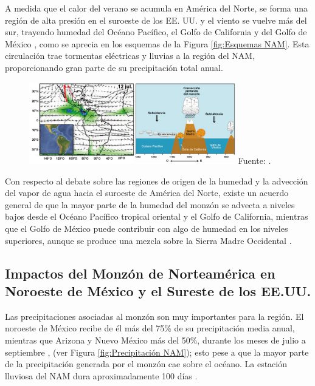 \documentclass[12pt]{article}
\begin{document}
A medida que el calor del verano se acumula en América del Norte, se forma una región de alta presión en el suroeste de los EE. UU. y el viento se vuelve más del sur, trayendo humedad del Océano Pacífico, el Golfo de California y del Golfo de México \cite{COMET2}, como se aprecia en los esquemas de la Figura \ref{fig:Esquemas NAM}. Esta circulación trae tormentas eléctricas y lluvias a la región del NAM, proporcionando gran parte de su precipitación total anual.

\begin{figure}[H]
	\begin{center}
 		\includegraphics[width = 0.8\textwidth]{Imagenes/Esquemas NAM.png}
 		Fuente: \cite{COMET}.
	\end{center} 
\end{figure}

Con respecto al debate sobre las regiones de origen de la humedad y la advección del vapor de agua hacia el suroeste de América del Norte, existe un acuerdo general de que la mayor parte de la humedad del monzón se advecta a niveles bajos desde el Océano Pacífico tropical oriental y el Golfo de California, mientras que el Golfo de México puede contribuir con algo de humedad en los niveles superiores, aunque se produce una mezcla sobre la Sierra Madre Occidental \cite{Climategov}.

\subsection{Impactos del Monzón de Norteamérica en Noroeste de México y el Sureste de los EE.UU.}

Las precipitaciones asociadas al monzón son muy importantes para la región. El noroeste de México recibe de él más del 75\% de su precipitación media anual, mientras que Arizona y Nuevo México más del 50\%, durante los meses de julio a septiembre \cite{Climategov}, (ver Figura \ref{fig:Precipitación NAM}); esto pese a que la mayor parte de la precipitación generada por el monzón cae sobre el océano. La estación lluviosa del NAM dura aproximadamente 100 días \cite{COMET2}.
\end{document}
